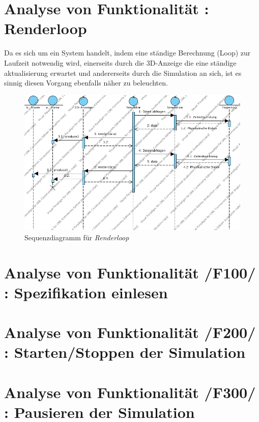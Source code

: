 
\section{Analyse von Funktionalität :  Renderloop}
Da es sich um ein System handelt, indem eine ständige Berechnung (Loop) zur Laufzeit notwendig wird, einerseits durch die 3D-Anzeige die eine ständige aktualisierung erwartet und andererseits durch
die Simulation an sich, ist es sinnig diesen Vorgang ebenfalls näher zu beleuchten.

\begin{figure}
\includegraphics[width=16cm]{bilder/render_loop}
\caption{Sequenzdiagramm für \textit{Renderloop}}
\label{labelname}
\end{figure}
\section{Analyse von Funktionalität /F100/ :  Spezifikation einlesen }
\section{Analyse von Funktionalität /F200/ :  Starten/Stoppen der Simulation}
\section{Analyse von Funktionalität /F300/ :  Pausieren der Simulation}
